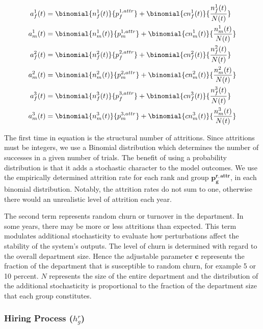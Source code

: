 \documentclass[12pt, a4paper, oneside, headinclude, footinclude,english]{article}
\begin{document}
\begin{align}
  a^1_f(t) &= \binomial{n^1_f(t)}{p^{1, attr}_f} + \binomial{cn^1_f(t)}{\frac{n^1_f(t)}{N(t)}}  \label{eq:attr_f1}\\
  a^1_m(t) &= \binomial{n^1_m(t)}{p^{1, attr}_m} + \binomial{cn^1_m(t)}{\frac{n^1_m(t)}{N(t)}} \label{eq:attr_m1} \\
  a^2_f(t) &= \binomial{n^2_f(t)}{p^{2, attr}_f} + \binomial{cn^2_f(t)}{\frac{n^2_f(t)}{N(t)}} \label{eq:attr_f2} \\
  a^2_m(t) &= \binomial{n^2_m(t)}{p^{2, attr}_m} + \binomial{cn^2_m(t)}{\frac{n^2_m(t)}{N(t)}} \label{eq:attr_m2} \\
  a^3_f(t) &= \binomial{n^3_f(t)}{p^{3, attr}_f} + \binomial{cn^3_f(t)}{\frac{n^3_f(t)}{N(t)}} \label{eq:attr_f3} \\
  a^3_m(t) &= \binomial{n^3_m(t)}{p^{3, attr}_m} + \binomial{cn^3_m(t)}{\frac{n^3_m(t)}{N(t)}} \label{eq:attr_m3} 
\end{align}

The first time in equation is the structural number of attritions. Since
attritions must be integers, we use a Binomial distribution which determines the
number of successes in a given number of trials. The benefit of using a
probability distribution is that it adds a stochastic character to the model
outcomes. We use the empirically determined attrition rate for each rank and
group $\bm{p^{r,attr}_g}$, in each binomial distribution. Notably, the attrition
rates do not sum to one, otherwise there would an unrealistic level of attrition
each year.

The second term represents random churn or turnover in the department. In some
years, there may be more or less attritions than expected. This term modulates
additional stochasticity to evaluate how perturbations affect the stability of
the system's outputs. The level of churn is determined with regard to the
overall department size. Hence the adjustable parameter $\bm{c}$ represents the
fraction of the department that is susceptible to random churn, for example 5 or 10
percent. $N$ represents the size of the entire department and the distribution
of the additional stochasticity is proportional to the fraction of the
department size that each group constitutes. 

\subsubsection{Hiring Process ($h^r_g$)}
\label{sec:hiring}
\end{document}

